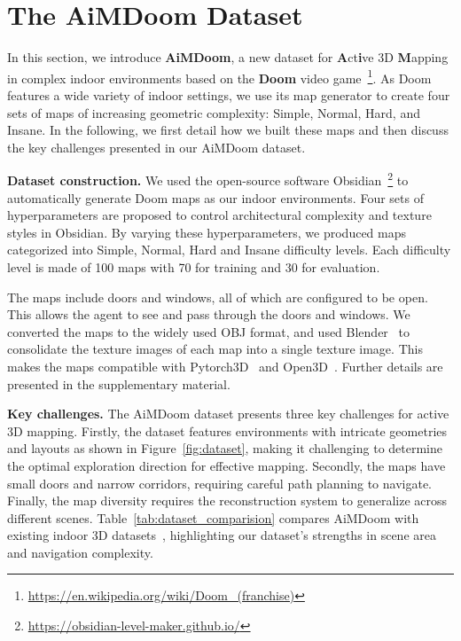 \section{The AiMDoom Dataset}
\label{dataset-sec}




In this section, we introduce \textbf{AiMDoom}, a new dataset for \textbf{A}ct\textbf{i}ve 3D \textbf{M}apping in complex indoor environments based on the \textbf{Doom} video game~\footnote{\url{https://en.wikipedia.org/wiki/Doom_(franchise)}}.
As Doom features a wide variety of indoor settings, we use its map generator to create four sets of maps of increasing geometric complexity: Simple, Normal, Hard, and Insane. In the following, we first detail how we built these maps and then discuss the key challenges presented in our AiMDoom dataset.



\noindent \textbf{Dataset construction.}
%
We used the open-source software Obsidian~\footnote{\url{https://obsidian-level-maker.github.io/}} to automatically generate Doom maps as our indoor environments.
Four sets of hyperparameters are proposed to control architectural complexity and texture styles in Obsidian. By varying these hyperparameters, we produced maps categorized into Simple, Normal, Hard and Insane difficulty levels. Each difficulty level is made of 100 maps with 70 for training and 30 for evaluation.


The maps include doors and windows, all of which are configured to be open. This allows the agent to see and pass through the doors and windows.
We converted the maps to the widely used OBJ format, and used Blender~\citep{blender} to consolidate the texture images of each map into a single texture image. This makes the maps compatible with Pytorch3D~\citep{pytorch3d} and Open3D~\citep{open3d}. 
Further details are presented in the supplementary material.


\noindent \textbf{Key challenges.}
%
The AiMDoom dataset presents three key challenges for active 3D mapping.
Firstly, the dataset features environments with intricate geometries and layouts as shown in Figure~\ref{fig:dataset}, making it challenging to determine the optimal exploration direction for effective mapping.
Secondly, the maps have small doors and narrow corridors, requiring careful path planning to navigate.
Finally, the map diversity requires the reconstruction system to generalize across different scenes.
Table~\ref{tab:dataset_comparision} compares AiMDoom with existing indoor 3D datasets~\citep{replica19arxiv, RoboTHOR, Matterport3D, dai2017scannet,gibson, ramakrishnan2021hm3d}, highlighting our dataset's strengths in scene area and navigation complexity.

